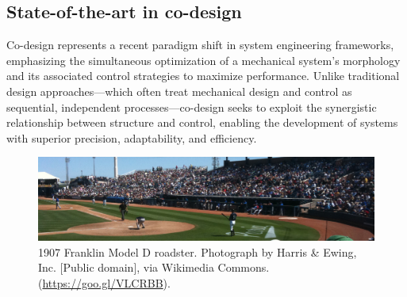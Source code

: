 \hypertarget{state-of-the-art-in-co-design}{%
\subsection{State-of-the-art in
co-design}\label{state-of-the-art-in-co-design}}

Co-design represents a recent paradigm shift in system engineering
frameworks, emphasizing the simultaneous optimization of a mechanical
system's morphology and its associated control strategies to maximize
performance. Unlike traditional design approaches---which often treat
mechanical design and control as sequential, independent
processes---co-design seeks to exploit the synergistic relationship
between structure and control, enabling the development of systems with
superior precision, adaptability, and efficiency.

\begin{figure}[!h]
  \includegraphics[width=\textwidth]{sampleteaser.pdf}
  \caption{1907 Franklin Model D roadster. Photograph by Harris \&
    Ewing, Inc. [Public domain], via Wikimedia
    Commons. (\url{https://goo.gl/VLCRBB}).}
\end{figure}

\lipsum[2-3]
